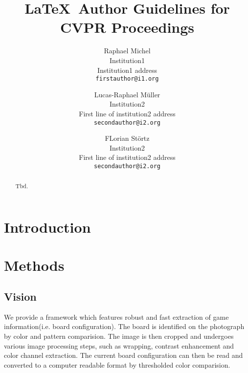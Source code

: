 \documentclass[10pt,twocolumn,letterpaper]{article}
\begin{document}
\title{\LaTeX\ Author Guidelines for CVPR Proceedings}

\author{Raphael Michel\\
Institution1\\
Institution1 address\\
{\tt\small firstauthor@i1.org}
\and
Lucas-Raphael Müller\\
Institution2\\
First line of institution2 address\\
{\tt\small secondauthor@i2.org}
\and
FLorian Störtz\\
Institution2\\
First line of institution2 address\\
{\tt\small secondauthor@i2.org}
}

\maketitle

\begin{abstract}
   Tbd.
\end{abstract}

\section{Introduction}

\section{Methods}

\subsection{Vision}
We provide a framework which features robust and fast extraction of game information(i.e. board configuration).
The board is identified on the photograph by color and pattern comparision.
The image is then cropped and undergoes various image processing steps, such as wrapping, contrast enhancement and color channel extraction.
The current board configuration can then be read and converted to a computer readable format by thresholded color comparision.
\end{document}
